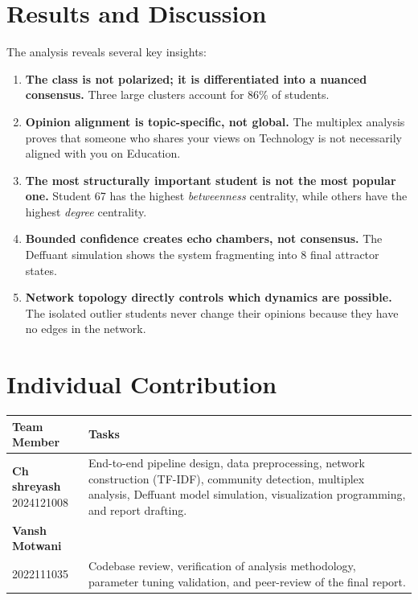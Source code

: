 \documentclass[11pt]{article}
\begin{document}
\section{Results and Discussion}
The analysis reveals several key insights:
\begin{enumerate}
    \item \textbf{The class is not polarized; it is differentiated into a nuanced consensus.} Three large clusters account for 86\% of students.
    \item \textbf{Opinion alignment is topic-specific, not global.} The multiplex analysis proves that someone who shares your views on Technology is not necessarily aligned with you on Education.
    \item \textbf{The most structurally important student is not the most popular one.} Student 67 has the highest \textit{betweenness} centrality, while others have the highest \textit{degree} centrality.
    \item \textbf{Bounded confidence creates echo chambers, not consensus.} The Deffuant simulation shows the system fragmenting into 8 final attractor states.
    \item \textbf{Network topology directly controls which dynamics are possible.} The isolated outlier students never change their opinions because they have no edges in the network.
\end{enumerate}

\section{Individual Contribution}
\begin{center}
\begin{tabular}{@{}p{3.5cm} p{11.5cm}@{}}
\toprule
\textbf{Team Member} & \textbf{Tasks} \\ \midrule
\parbox[t]{3.5cm}{\textbf{Ch shreyash}\\2024121008} & End-to-end pipeline design, data preprocessing, network construction (TF-IDF), community detection, multiplex analysis, Deffuant model simulation, visualization programming, and report drafting. \\
\textbf{Vansh Motwani} \\ 2022111035 & Codebase review, verification of analysis methodology, parameter tuning validation, and peer-review of the final report. \\ \bottomrule
\end{tabular}
\end{center}
\end{document}
